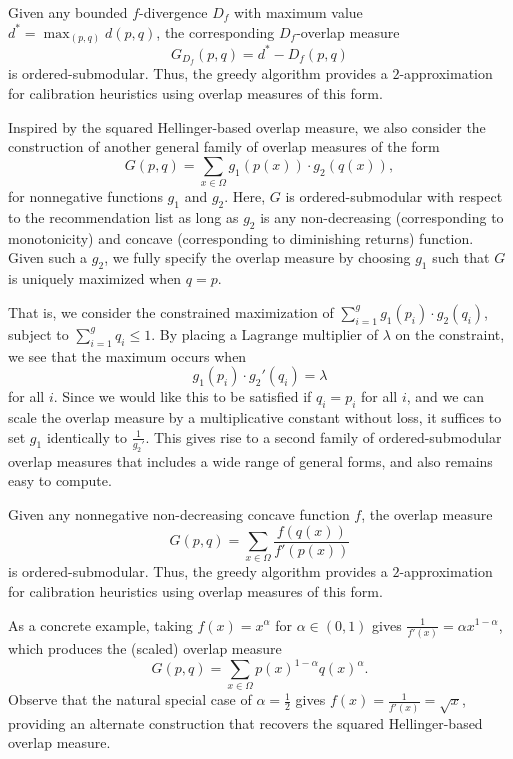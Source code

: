 \begin{thm} \label{thm:overlap_fdiv}
Given any bounded $f$-divergence $D_f$ with maximum value $d^* = \max_{(p,q)} d(p,q)$, the corresponding $D_f$-overlap measure $$G_{D_f}(p,q) = d^* - D_f(p,q)$$ is ordered-submodular. Thus, the greedy algorithm provides a $2$-approximation for calibration heuristics using overlap measures of this form.
\end{thm}

Inspired by the squared Hellinger-based overlap measure, we also consider the construction of another general family of overlap measures of the form $$G(p,q) = \sum_{x\in \Omega} g_1(p(x)) \cdot g_2(q(x)),$$ for nonnegative functions $g_1$ and $g_2$. Here, $G$ is ordered-submodular with respect to the recommendation list as long as $g_2$ is any non-decreasing (corresponding to monotonicity) and concave (corresponding to diminishing returns) function. Given such a $g_2$, we fully specify the overlap measure by choosing $g_1$ such that $G$ is uniquely maximized when $q=p$.

That is, we consider the constrained maximization of $\sum_{i=1}^g g_1(p_i) \cdot g_2 (q_i)$, subject to $\sum_{i=1}^g q_i \le 1$. By placing a Lagrange multiplier of $\lambda$ on the constraint, we see that the maximum occurs when $$g_1 (p_i) \cdot g_2' (q_i) = \lambda$$ for all $i$. Since we would like this to be satisfied if $q_i = p_i$ for all $i$, and we can scale the overlap measure by a multiplicative constant without loss, it suffices to set $g_1$ identically to $\frac{1}{g_2'}$. This gives rise to a second family of ordered-submodular overlap measures that includes a wide range of general forms, and also remains easy to compute. 

\begin{thm} \label{thm:overlap_g1g2}
Given any nonnegative non-decreasing concave function $f$, the overlap measure $$G(p,q) = \sum_{x\in \Omega} \frac{f(q(x))}{f'(p(x))}$$ is ordered-submodular. Thus, the greedy algorithm provides a $2$-approximation for calibration heuristics using overlap measures of this form.
\end{thm}

As a concrete example, taking $f(x) = x^\alpha$ for $\alpha \in (0,1)$ gives $\frac{1}{f'(x)} = \alpha x^{1-\alpha}$, which produces the (scaled) overlap measure $$G(p,q) = \sum_{x\in \Omega} p(x)^{1-\alpha} q(x)^\alpha.$$ 
Observe that the natural special case of $\alpha = \frac{1}{2}$ gives $f(x) = \frac{1}{f'(x)} = \sqrt{x}$, providing an alternate construction that recovers the squared Hellinger-based overlap measure.

